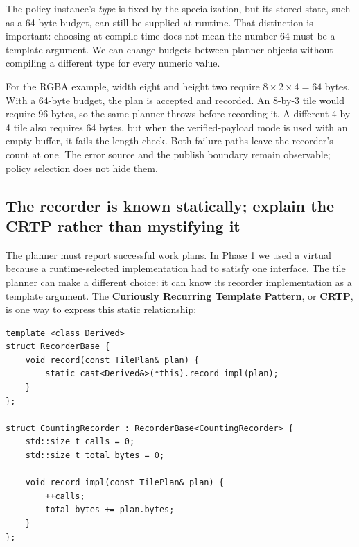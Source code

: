 The policy instance's \emph{type} is fixed by the specialization, but its stored state, such as a 64-byte budget, can still be supplied at runtime. That distinction is important: choosing  at compile time does not mean the number 64 must be a template argument. We can change budgets between planner objects without compiling a different type for every numeric value.

For the RGBA example, width eight and height two require \(8\times2\times4=64\) bytes. With a 64-byte budget, the plan is accepted and recorded. An 8-by-3 tile would require 96 bytes, so the same planner throws before recording it. A different 4-by-4 tile also requires 64 bytes, but when the verified-payload mode is used with an empty buffer, it fails the length check. Both failure paths leave the recorder's count at one. The error source and the publish boundary remain observable; policy selection does not hide them.

\subsection{The recorder is known statically; explain the CRTP rather than mystifying it}\label{01-foundations-i-ch005-the-recorder-is-known-statically-explain-the-crtp-rather-than-mystifying-it}

\hypertarget{01-foundations-i-ch005-the-recorder-is-known-statically-explain-the-crtp-rather-than-mystifying-it}{}

The planner must report successful work plans. In Phase 1 we used a virtual  because a runtime-selected implementation had to satisfy one interface. The tile planner can make a different choice: it can know its recorder implementation as a template argument. The \textbf{Curiously Recurring Template Pattern}, or \textbf{CRTP}, is one way to express this static relationship:

\begin{verbatim}
template <class Derived>
struct RecorderBase {
    void record(const TilePlan& plan) {
        static_cast<Derived&>(*this).record_impl(plan);
    }
};

struct CountingRecorder : RecorderBase<CountingRecorder> {
    std::size_t calls = 0;
    std::size_t total_bytes = 0;

    void record_impl(const TilePlan& plan) {
        ++calls;
        total_bytes += plan.bytes;
    }
};
\end{verbatim}

